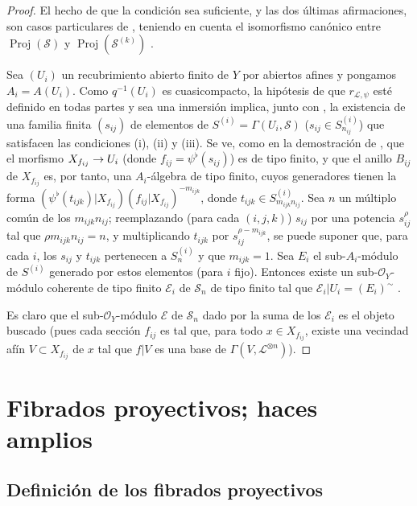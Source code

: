 \documentclass[oneside,10pt]{amsart}
\makeatletter
\newcommand{\ega@arrow}[2]{\mathchoice{#1}{#2}{#2}{#2}}
\renewcommand{\to}{\ega@arrow{\longrightarrow}{\rightarrow}}
\newcommand{\oldpage}[2][]{\marginnote{\normalfont\footnotesize\textbf{#1}~|~#2}\ignorespaces}
\let\EGAOriginalLabel\label
\renewcommand{\label}[1]{\phantomsection\EGAOriginalLabel{#1}}
\makeatother
\begin{document}
\begin{proof}
El hecho de que la condición sea suficiente, y las dos últimas afirmaciones, son casos particulares de , teniendo en cuenta el isomorfismo canónico entre $\operatorname{Proj}(\mathcal{S})$ y $\operatorname{Proj}(\mathcal{S}^{(k)})$ .

Sea $(U_i)$ un recubrimiento abierto finito de $Y$ por abiertos afines y pongamos $A_i=A(U_i)$.
Como $q^{-1}(U_i)$ es cuasicompacto, la hipótesis de que $r_{\mathcal{L},\psi}$ esté definido en todas partes y sea una inmersión implica, junto con , la existencia de una familia finita $(s_{ij})$ de elementos de $S^{(i)}=\Gamma(U_i,\mathcal{S})$ ($s_{ij}\in S_{n_{ij}}^{(i)}$) que satisfacen las condiciones (i), (ii) y (iii).
Se ve, como en la demostración de , que el morfismo $X_{f_{ij}}\to U_i$ (donde $f_{ij}=\psi^\flat(s_{ij})$) es de tipo finito, y que el anillo $B_{ij}$ de $X_{f_{ij}}$ es, por tanto, una $A_i$-álgebra de tipo finito, cuyos generadores tienen la forma $(\psi^\flat(t_{ijk})|X_{f_{ij}})(f_{ij}|X_{f_{ij}})^{-m_{ijk}}$, donde $t_{ijk}\in S_{m_{ijk}n_{ij}}^{(i)}$.
Sea $n$ un múltiplo común de los $m_{ijk}n_{ij}$;
reemplazando (para cada $(i,j,k)$) $s_{ij}$ por una potencia $s_{ij}^\rho$ tal que $\rho m_{ijk}n_{ij}=n$, y multiplicando $t_{ijk}$ por $s_{ij}^{\rho-m_{ijk}}$, se puede suponer que, para cada $i$, los $s_{ij}$ y $t_{ijk}$ pertenecen a $S_n^{(i)}$ y que $m_{ijk}=1$.
Sea $E_i$ el sub-$A_i$-módulo de $S^{(i)}$ generado por estos elementos (para $i$ fijo).
Entonces existe un sub-$\mathcal{O}_Y$-módulo coherente de tipo 
\oldpage[II]{71}
finito $\mathcal{E}_i$ de $\mathcal{S}_n$ de tipo finito tal que $\mathcal{E}_i|U_i=(E_i)^{\sim}$ .

Es claro que el sub-$\mathcal{O}_Y$-módulo $\mathcal{E}$ de $\mathcal{S}_n$ dado por la suma de los $\mathcal{E}_i$ es el objeto buscado (pues cada sección $f_{ij}$ es tal que, para todo $x\in X_{f_{ij}}$, existe una vecindad afín $V\subset X_{f_{ij}}$ de $x$ tal que $f|V$ es una base de $\Gamma(V,\mathcal{L}^{\otimes n})$).
\end{proof}

\section{Fibrados proyectivos; haces amplios}
\label{section:II.4-fr}

\subsection{Definición de los fibrados proyectivos}
\label{subsection:II.4.1-fr}
\end{document}
